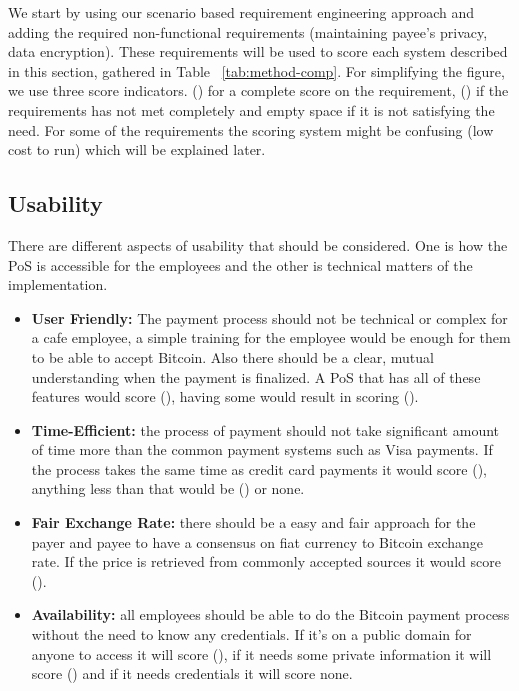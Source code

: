 We start by using our scenario based requirement engineering approach and adding the required non-functional requirements (\eg maintaining payee's privacy, data encryption). These requirements will be used to score each system described in this section, gathered in Table ~\ref{tab:method-comp}. For simplifying the figure, we use three score indicators. (\full) for a complete score on the requirement, (\prt) if the requirements has not met completely and empty space if it is not satisfying the need. For some of the requirements the scoring system might be confusing (\eg low cost to run) which will be explained later.

\subsection{Usability} There are different aspects of usability that should be considered. One is how the PoS is accessible for the employees and the other is technical matters of the implementation.
\begin{itemize}

\item \textbf{User Friendly: }The payment process should not be technical or complex for a cafe employee, a simple training for the employee would be enough for them to be able to accept Bitcoin. Also there should be a clear, mutual understanding when the payment is finalized. A PoS that has all of these features would score (\full), having some would result in scoring (\prt).

\item \textbf{Time-Efficient: }the process of payment should not take significant amount of time more than the common payment systems such as Visa payments. If the process takes the same time as credit card payments it would score (\full), anything less than that would be (\prt) or none.

\item \textbf{Fair Exchange Rate: }there should be a easy and fair approach for the payer and payee to have a consensus on fiat currency to Bitcoin exchange rate. If the price is retrieved from commonly accepted sources it would score (\full).

\item \textbf{Availability: }all employees should be able to do the Bitcoin payment process without the need to know any credentials. If it's on a public domain for anyone to access it will score (\full), if it needs some private information it will score (\prt) and if it needs credentials it will score none.

\end{itemize}
